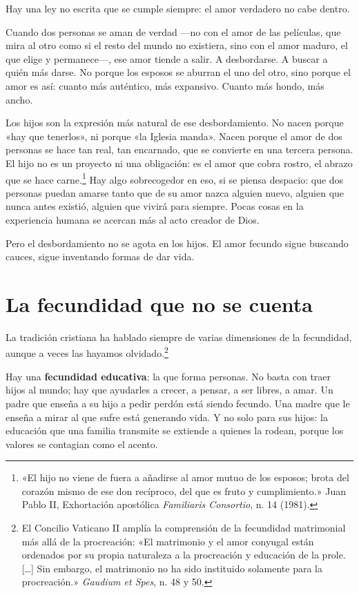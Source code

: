 Hay una ley no escrita que se cumple siempre: el amor verdadero no cabe dentro.

Cuando dos personas se aman de verdad ---no con el amor de las películas, que mira al otro como si el resto del mundo no existiera, sino con el amor maduro, el que elige y permanece---, ese amor tiende a salir. A desbordarse. A buscar a quién más darse. No porque los esposos se aburran el uno del otro, sino porque el amor es así: cuanto más auténtico, más expansivo. Cuanto más hondo, más ancho.

Los hijos son la expresión más natural de ese desbordamiento. No nacen porque «hay que tenerlos», ni porque «la Iglesia manda». Nacen porque el amor de dos personas se hace tan real, tan encarnado, que se convierte en una tercera persona. El hijo no es un proyecto ni una obligación: es el amor que cobra rostro, el abrazo que se hace carne.\footnote{«El hijo no viene de fuera a añadirse al amor mutuo de los esposos; brota del corazón mismo de ese don recíproco, del que es fruto y cumplimiento.» Juan Pablo II, Exhortación apostólica \textit{Familiaris Consortio}, n. 14 (1981).} Hay algo sobrecogedor en eso, si se piensa despacio: que dos personas puedan amarse tanto que de su amor nazca alguien nuevo, alguien que nunca antes existió, alguien que vivirá para siempre. Pocas cosas en la experiencia humana se acercan más al acto creador de Dios.

Pero el desbordamiento no se agota en los hijos. El amor fecundo sigue buscando cauces, sigue inventando formas de dar vida.

\section{La fecundidad que no se cuenta}

La tradición cristiana ha hablado siempre de varias dimensiones de la fecundidad, aunque a veces las hayamos olvidado.\footnote{El Concilio Vaticano II amplía la comprensión de la fecundidad matrimonial más allá de la procreación: «El matrimonio y el amor conyugal están ordenados por su propia naturaleza a la procreación y educación de la prole. [\ldots] Sin embargo, el matrimonio no ha sido instituido solamente para la procreación.» \textit{Gaudium et Spes}, n. 48 y 50.}

Hay una \textbf{fecundidad educativa}: la que forma personas. No basta con traer hijos al mundo; hay que ayudarles a crecer, a pensar, a ser libres, a amar. Un padre que enseña a su hijo a pedir perdón está siendo fecundo. Una madre que le enseña a mirar al que sufre está generando vida. Y no solo para sus hijos: la educación que una familia transmite se extiende a quienes la rodean, porque los valores se contagian como el acento.

